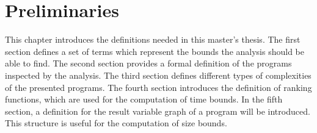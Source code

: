 \section{Preliminaries}

This chapter introduces the definitions needed in this master's thesis.
The first section defines a set of terms which represent the bounds the analysis should be able to find. 
The second section provides a formal definition of the programs inspected by the analysis.
The third section defines different types of complexities of the presented programs. 
The fourth section introduces the definition of ranking functions, which are used for the computation of time bounds.
In the fifth section, a definition for the result variable graph of a program will be introduced.
This structure is useful for the computation of size bounds.








